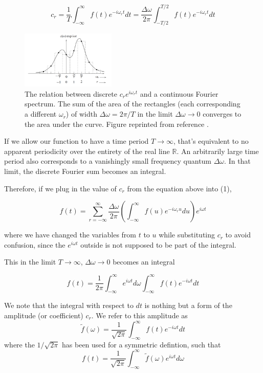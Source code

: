 \documentclass{article}
\begin{document}
	$$ c_r = \frac{1}{T}  \int_{-\infty}^{\infty} f(t) e^{-i\omega_r t} dt =
	 \frac{\Delta\omega}{2\pi}  \int_{-T/2}^{T/2} f(t) e^{-i\omega_r t} dt$$
	
	\begin{figure}[h!]
		\centering
		\includegraphics[width=0.4\textwidth]{integral_fig}
		\caption{The relation between discrete $c_r e^{i\omega_r t}$ and a continuous Fourier spectrum. The sum of the area of the rectangles (each corresponding a different $\omega_r$) of width $\Delta \omega = 2\pi/T$ in the limit $\Delta \omega \to 0$ converges to the area under the curve. Figure reprinted from reference \cite{riley+}.}
		
	\end{figure}
	
	If we allow our function to have a time period $T \to \infty$, that's equivalent to no apparent periodicity over the entirety of the real line $\mathbb{R}$. An arbitrarily large time period also corresponds to a vanishingly small frequency quantum $\Delta \omega$. In that limit, the discrete Fourier sum becomes an integral.
	
	Therefore, if we plug in the value of $c_r$ from the equation above into (1),
	
	$$  f(t) = \sum_{r=-\infty}^{\infty} \frac{\Delta\omega}{2\pi}\left(\int_{-\infty}^{\infty} f(u) e^{-i\omega_r u} du \right) e^{i\omega t}$$
	
	where we have changed the variables from $t$ to $u$ while substituting $c_r$ to avoid confusion, since the $e^{i\omega t}$ outside is not supposed to be part of the integral.
	
	
	This in the limit $T\to \infty$, $\Delta \omega \to 0$ becomes an integral
	
	$$ f(t) = \frac{1}{2\pi} \int_{-\infty}^{\infty} e^{i\omega t} d\omega \int_{-\infty}^{\infty} f(t)e^{-i\omega t} dt$$
	
	We note that the integral with respect to $dt$ is nothing but a form of the amplitude (or coefficient) $c_r$. We refer to this amplitude as $$\tilde{f}(\omega) = \frac{1}{\sqrt{2\pi}} \int_{-\infty}^{\infty} f(t)e^{-i\omega t} dt $$
	where the $1/\sqrt{2\pi}$ has been used for a symmetric defintion, such that
	$$ f(t) = \frac{1}{\sqrt{2\pi}} \int_{-\infty}^{\infty} \tilde{f}(\omega)e^{i\omega t} d\omega $$
	
\end{document}
